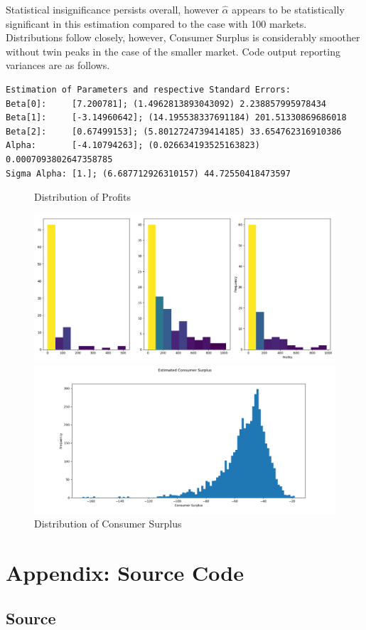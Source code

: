 \documentclass{article}
\begin{document}
\par Statistical insignificance persists overall, however $\hat{\alpha}$ appears to be statistically significant in this estimation compared to the case with 100 markets. Distributions follow closely, however, Consumer Surplus is considerably smoother without twin peaks in the case of the smaller market. Code output reporting variances are as follows.

\begin{lstlisting}
Estimation of Parameters and respective Standard Errors:
Beta[0]:     [7.200781]; (1.4962813893043092) 2.238857995978434
Beta[1]:     [-3.14960642]; (14.195538337691184) 201.51330869686018
Beta[2]:     [0.67499153]; (5.8012724739414185) 33.654762316910386
Alpha:       [-4.10794263]; (0.026634193525163823) 0.0007093802647358785
Sigma Alpha: [1.]; (6.687712926310157) 44.72550418473597
\end{lstlisting}

\begin{figure}[h]
  \caption{Distribution of Profits}
  \centering
    \includegraphics[width=1.0\textwidth]{fig_hist_profitsW10_e}
  \caption{Distribution of Consumer Surplus}
  \centering
    \includegraphics[width=1.0\textwidth]{fig_hist_consumersurplusW10_e}
\end{figure}
\FloatBarrier

\newpage
\section{Appendix: Source Code}
\subsection{Source}


\end{document}
